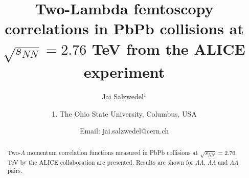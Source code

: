 \documentclass[ALICE,manyauthors]{ALICE_internal_notes}
\begin{document}
%
%
%
\begin{titlepage}
%
%
%
\title{Two-Lambda femtoscopy correlations in PbPb collisions at $\sqrt{s_{NN}}=2.76$ TeV from the ALICE experiment}
%
\author{Jai Salzwedel$^{1}$}
\author{
1. The Ohio State University, Columbus, USA\\
}
\author{Email: jai.salzwedel@cern.ch}
%
%
\begin{abstract}
Two-$\Lambda$ momentum correlation functions measured in PbPb collisions at $\sqrt{s_{NN}}=2.76$ TeV by the ALICE collaboration are presented.  Results are shown for $\Lambda\Lambda$, $\bar{\Lambda}\bar{\Lambda}$ and $\Lambda\bar{\Lambda}$ pairs.
\end{abstract}
\end{titlepage}
%

\end{document}
